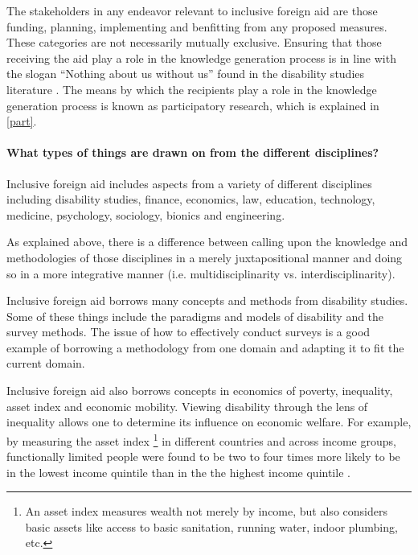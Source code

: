 \documentclass[a4paper]{article}
\begin{document}
The stakeholders in any endeavor relevant to inclusive foreign aid are those
funding, planning, implementing and benfitting from any proposed measures.
These categories are not necessarily mutually exclusive. Ensuring that those
receiving the aid play a role in the knowledge generation process is in line
with the slogan ``Nothing about us without us'' found in the disability
studies literature \citep{pfeiffer2000disability}. The means by which the
recipients play a role in the knowledge generation process is known as
participatory research, which is explained in \autoref{part}.

\paragraph{What types of things are drawn on from the different disciplines?}

Inclusive foreign aid includes aspects from a variety of different disciplines
including disability studies, finance, economics, law, education, technology,
medicine, psychology, sociology, bionics and engineering. 

As explained above, there is a difference between calling upon the knowledge and
methodologies of those disciplines in a merely juxtapositional manner and
doing so in a more integrative manner (i.e. multidisciplinarity vs.
interdisciplinarity).

Inclusive foreign aid borrows many concepts and methods from disability
studies. Some of these things include the paradigms and models of disability
and the survey methods. The issue of how to effectively conduct surveys is a
good example of borrowing a methodology from one domain and adapting it to fit
the current domain. 

Inclusive foreign aid also borrows concepts in economics of poverty,
inequality, asset index and economic mobility. Viewing disability through the
lens of inequality allows one to determine its influence on economic welfare.
For example, by measuring the asset index \footnote{An asset index measures
wealth not merely by income, but also considers basic assets like access to
basic sanitation, running water, indoor plumbing, etc.} in different countries
and across income groups, functionally limited people were found to be two to
four times more likely to be in the lowest income quintile than in the
the highest income quintile \citep{mitra2018disability}.  
\end{document}
